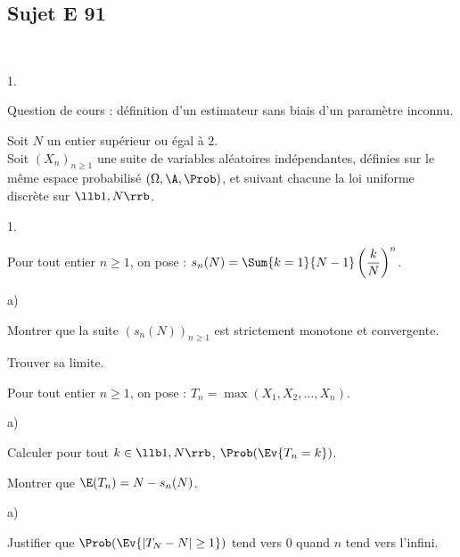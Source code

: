 \documentclass[11pt]{article}%
\begin{document}
\subsection*{Sujet E 91}


\begin{exerciceAP}~
  \begin{noliste}{1.}
    \setlength{\itemsep}{2mm}
    \item Question de cours : définition d'un estimateur sans biais
    d'un paramètre inconnu.
  \end{noliste}
  
  \noindent
  Soit $N$ un entier supérieur ou égal à $2$.\\
  Soit $(X_n)_{n\geq 1}$ une suite de variables aléatoires 
  indépendantes, définies sur le même espace probabilisé 
  $(\Omega, \A, \Prob)$, et suivant chacune la loi uniforme discrète
  sur $\llb 1,N \rrb$.
  \begin{noliste}{1.}
    \setlength{\itemsep}{2mm}
    \setcounter{enumi}{1}
    \item Pour tout entier $n\geq 1$, on pose : $s_n(N) = 
    \Sum{k=1}{N-1} \left( \dfrac{k}{N} \right)^n$.
    \begin{noliste}{a)}
    \setlength{\itemsep}{2mm}
      \item Montrer que la suite $(s_n(N))_{n\geq 1}$ est 
      strictement monotone et convergente.
      
      \item Trouver sa limite.
    \end{noliste}
    
    \item Pour tout entier $n\geq 1$, on pose : $T_n = \max(X_1,
    X_2, \ldots, X_n)$.
    \begin{noliste}{a)}
    \setlength{\itemsep}{2mm}
      \item Calculer pour tout $k\in \llb 1,N \rrb$, $\Prob(
      \Ev{T_n=k})$.
      
      \item Montrer que $\E(T_n) = N - s_n(N)$.
    \end{noliste}
    
    \item 
    \begin{noliste}{a)}
    \setlength{\itemsep}{2mm}
      \item Justifier que $\Prob(\Ev{ \vert T_N - N \vert \geq 1})$
      tend vers $0$ quand $n$ tend vers l'infini.
      

\end{noliste}
\end{noliste}
\end{exerciceAP}
\end{document}
